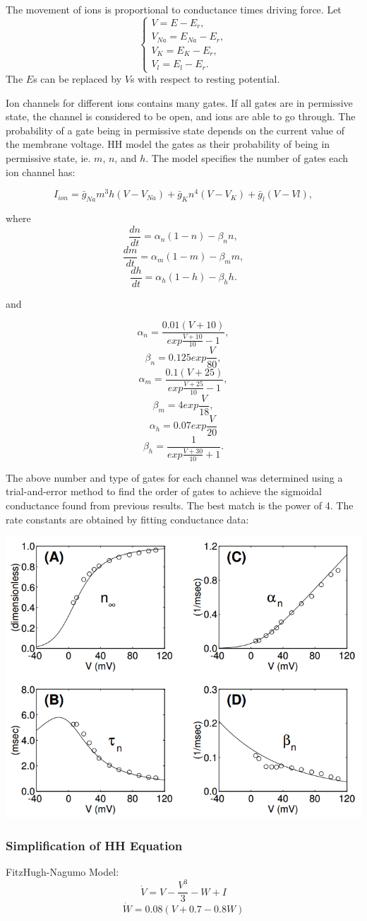 The movement of ions is proportional to conductance times driving force.
Let
$$
\begin{cases}
  V = E - E_r, \\
  V_{Na} = E_{Na} - E_r, \\
  V_{K} = E_{K} - E_r, \\
  V_{l} = E_{l} - E_r.
\end{cases}
$$
The $E$s can be replaced by $V$s with respect to resting potential.

Ion channels for different ions contains many gates. If all gates are in permissive state, the channel is considered to be open, and ions are able to go through. The
probability of a gate being in permissive state depends on the current value of the membrane voltage. HH model the gates as their probability of being in permissive
state, ie. $m$, $n$, and $h$. The model specifies the number of gates each ion channel has:

$$
I_{ion} = {\bar{g}}_{Na} m^3 h (V - V_{Na}) + {\bar{g}}_K n^4 (V - V_K) + {\bar{g}}_l (V - Vl),
$$

where
$$ \frac{dn}{dt} = \alpha_n (1 - n) - \beta_n n, $$
$$ \frac{dm}{dt} = \alpha_m (1 - m) - \beta_m m, $$
$$ \frac{dh}{dt} = \alpha_h (1 - h) - \beta_h h. $$

and

$$ \alpha_n = \frac{0.01(V + 10)}{exp \frac{V + 10}{10} - 1}, $$
$$ \beta_n = 0.125 exp \frac{V}{80}, $$
$$ \alpha_m = \frac{0.1(V + 25)}{exp \frac{V + 25}{10} - 1}, $$
$$ \beta_m = 4 exp \frac{V}{18}, $$
$$ \alpha_h = 0.07 exp \frac{V}{20} $$
$$ \beta_h = \frac{1}{exp \frac{V + 30}{10} + 1}. $$

The above number and type of gates for each channel was determined using a trial-and-error method to find the order of gates to achieve the sigmoidal conductance found
from previous results. The best match is the power of 4. The rate constants are obtained by fitting conductance data:

\includegraphics[scale=0.6]{graphics/RateConstants}

\subsubsection{Simplification of HH Equation}
FitzHugh-Nagumo Model:
$$ \dot{V} = V - \frac{V^3}{3} - W + I $$
$$ \dot{W} = 0.08(V + 0.7 - 0.8W) $$



